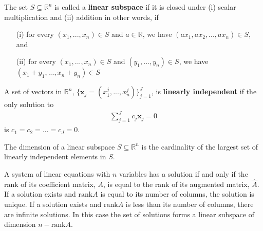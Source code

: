\documentclass[compress]{beamer}
\newcommand{\rank}{\mathrm{rank}}
\begin{document}
\begin{frame}
  \begin{definition}
    The set $S \subseteq \mathbb{R}^n$ is called a \textbf{linear
      subspace} if it is closed under (i) scalar multiplication and (ii)
    addition in other words, if 
    \begin{itemize}
    \item[(i)] for every $(x_1, ..., x_n)\in S$ and $a \in \mathbb{R}$,
      we have $(a x_1, a x_2, ..., a x_n) \in S$, and
    \item[(ii)] for every $(x_1, ..., x_n)\in S$ and $(y_1, ..., y_n)\in
      S$, we have
      $(x_1 + y_1, ..., x_n + y_n)  \in S$
    \end{itemize}
  \end{definition}
\end{frame}

\begin{frame}
  \begin{definition}
    A set of vectors in $\mathbb{R}^n$, $\{\textbf{x}_j = (x^j_1,...,
    x^j_n)\}_{j=1}^J$, is \textbf{linearly independent} if the only
    solution to 
    \begin{align*}
      \sum_{j=1}^J c_j \textbf{x}_j = 0 
    \end{align*}
    is $c_1 = c_2 = ... = c_J = 0$. 
  \end{definition}

  \begin{definition}
    The dimension of a linear subspace $S \subseteq \mathbb{R}^n$ is the
    cardinality of the largest set of linearly independent elements in
    $S$. 
  \end{definition} 
\end{frame}

\begin{frame}
  \begin{theorem} \label{thm:rc} A system of linear
    equations with $n$ variables has a solution if and only if the rank
    of its coefficient matrix, $A$, is equal to the rank of its
    augmented matrix, $\hat{A}$. If a solution exists and $\rank A$ is
    equal to its number of columns, the solution is unique. If a
    solution exists and $\rank A$ is less than its number of columns,
    there are infinite solutions. In this case the set of solutions
    forms a linear subspace of dimension $n - \rank A$.
  \end{theorem}
\end{frame}
\end{document}
